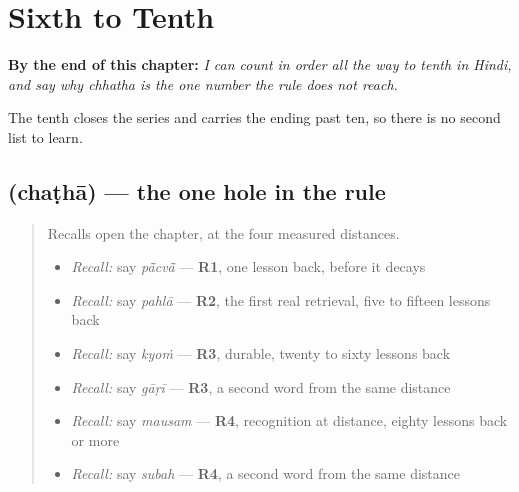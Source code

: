 
\chapter{Sixth to Tenth}
\label{ch:hi-ordinals-to-tenth}

\begin{chapteropening}
\textbf{By the end of this chapter:} \emph{I can count in order all the way to tenth in Hindi, and say why chhatha is the one number the rule does not reach.}

The tenth closes the series and carries the ending past ten, so there is no second list to learn.
\end{chapteropening}

\section[\texorpdfstring{\hi{छठा} / \hi{छठी} (chaṭhā / chaṭhī)}{छठा / छठी (chaṭhā / chaṭhī)}]{ (chaṭhā) — the one hole in the rule}

\label{lesson:HI-C76-sixth}



\begin{quote}
Recalls open the chapter, at the four measured distances.

\begin{itemize}
\raggedright
  \item \emph{Recall:} say \emph{pā̃cvā̃} — \textbf{R1}, one lesson back, before it decays
  \item \emph{Recall:} say \emph{pahlā} — \textbf{R2}, the first real retrieval, five to fifteen lessons back
  \item \emph{Recall:} say \emph{kyoṁ} — \textbf{R3}, durable, twenty to sixty lessons back
  \item \emph{Recall:} say \emph{gāṛī} — \textbf{R3}, a second word from the same distance
  \item \emph{Recall:} say \emph{mausam} — \textbf{R4}, recognition at distance, eighty lessons back or more
  \item \emph{Recall:} say \emph{subah} — \textbf{R4}, a second word from the same distance
\end{itemize}
\end{quote}

